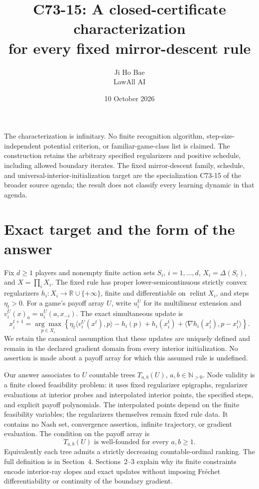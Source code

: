 \documentclass[11pt,a4paper]{article}
\title{C73-15: A closed-certificate characterization\\for every fixed mirror-descent rule}
\author{Ji Ho Bae\\\small LawAll AI}
\date{10 October 2026}
\newcommand{\R}{\mathbb R}
\newcommand{\N}{\mathbb N}
\newcommand{\ri}{\operatorname{relint}}
\begin{document}
\maketitle

The characterization is infinitary. No finite recognition algorithm,
step-size-independent potential criterion, or familiar-game-class list is
claimed. The construction retains the arbitrary specified regularizers and
positive schedule, including allowed boundary iterates. The fixed
mirror-descent family, schedule, and universal-interior-initialization target
are the specialization C73-15 of the broader source agenda; the
result does not classify every learning dynamic in that agenda.

\section{Exact target and the form of the answer}

Fix \(d\ge1\) players and nonempty finite action sets \(S_i\), \(i=1,\ldots,d\),
\(X_i=\Delta(S_i)\), and \(X=\prod_iX_i\).
The fixed rule has proper lower-semicontinuous strictly convex regularizers
\(h_i:X_i\to\R\cup\{+\infty\}\), finite and differentiable on
\(\ri X_i\), and steps \(\eta_t>0\). For a game's payoff array \(U\),
write \(u_i^U\) for its multilinear extension and
\(v_i^U(x)_a=u_i^U(a,x_{-i})\). The exact simultaneous update is
\begin{equation}
x_i^{t+1}=\underset{p\in X_i}{\arg\max}
\left\{\eta_t\langle v_i^U(x^t),p\rangle
 -h_i(p)+h_i(x_i^t)
 +\langle\nabla h_i(x_i^t),p-x_i^t\rangle\right\}.
\label{eq:md}
\end{equation}
We retain the canonical assumption that these updates are uniquely defined and
remain in the declared gradient domain from every interior initialization.
No assertion is made about a payoff array for which this assumed rule is undefined.

Our answer associates to \(U\) countable trees \(T_{a,b}(U)\),
\(a,b\in\N_{>0}\). Node validity is a finite closed feasibility problem:
it uses fixed regularizer epigraphs, regularizer evaluations at interior probes
and interpolated interior points, the specified steps, and explicit payoff
polynomials. The interpolated points depend on the finite feasibility variables;
the regularizers themselves remain fixed rule data. It contains no Nash set,
convergence assertion, infinite trajectory, or gradient evaluation.
The condition on the payoff array is
\begin{equation}
\boxed{\quad T_{a,b}(U)\text{ is well-founded for every }a,b\ge1.\quad}
\label{eq:wf}
\end{equation}
Equivalently each tree admits a strictly decreasing countable-ordinal ranking.
The full definition is in Section~4. Sections~2--3 explain why its finite
constraints encode interior-ray slopes and exact updates without imposing
Fr\'echet differentiability or continuity of the boundary gradient.
\end{document}
